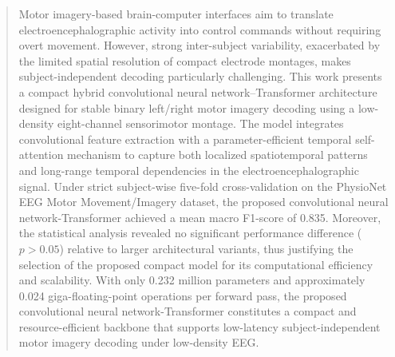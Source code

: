 \documentclass[a4paper,fleqn]{cas-dc}
\begin{document}




\begin{abstract}
Motor imagery-based brain-computer interfaces aim to translate electroencephalographic activity into control commands without requiring overt movement. However, strong inter-subject variability, exacerbated by the limited spatial resolution of compact electrode montages, makes subject-independent decoding particularly challenging. This work presents a compact hybrid convolutional neural network–Transformer architecture designed for stable binary left/right motor imagery decoding using a low-density eight-channel sensorimotor montage. The model integrates convolutional feature extraction with a parameter-efficient temporal self-attention mechanism to capture both localized spatiotemporal patterns and long-range temporal dependencies in the electroencephalographic signal. Under strict subject-wise five-fold cross-validation on the PhysioNet EEG Motor Movement/Imagery dataset, the proposed convolutional neural network-Transformer achieved a mean macro F1-score of 0.835. Moreover, the statistical analysis revealed no significant performance difference ($p > 0.05$) relative to larger architectural variants, thus justifying the selection of the proposed compact model for its computational efficiency and scalability. With only 0.232 million parameters and approximately 0.024 giga-floating-point operations per forward pass, the proposed convolutional neural network-Transformer constitutes a compact and resource-efficient backbone that supports low-latency subject-independent motor imagery decoding under low-density EEG.
\end{abstract}
\end{document}
